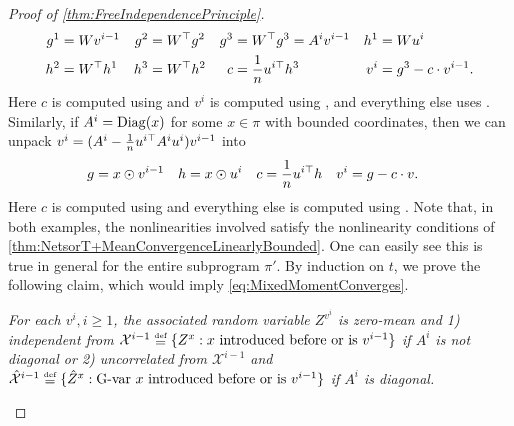 \documentclass[main.tex]{subfiles}
\begin{document}
\begin{proof}[Proof of \cref{thm:FreeIndependencePrinciple}]
\begin{align*}
g^{1} & =Wv^{i-1}&
g^{2} & =W^{\top}g^{2}&
g^{3} & =W^{\top}g^{3}=A^{i}v^{i-1}&
h^{1} & =Wu^{i}\\
h^{2} & =W^{\top}h^{1}&
h^{3} & =W^{\top}h^{2}&
c & =\frac{1}{n}u^{i\top}h^{3}&
v^{i} & =g^{3}-c\cdot v^{i-1}.
\end{align*}
Here $c$ is computed using  and $v^i$ is computed using , and everything else uses .
Similarly, if $A^{i}=\mathrm{Diag}(x)$ for some $x\in\pi$ with bounded coordinates, then we can unpack $v^{i}=(A^{i}-\frac{1}{n}u^{i\top}A^{i}u^{i})v^{i-1}$ into
\begin{align*}
g & =x\odot v^{i-1}&
h & =x\odot u^{i}&
c & =\frac{1}{n}u^{i\top}h&
v^{i} & =g-c\cdot v.
\end{align*}
Here $c$ is computed using  and everything else is computed using .
Note that, in both examples, the nonlinearities involved satisfy the nonlinearity conditions of \cref{thm:NetsorT+MeanConvergenceLinearlyBounded}.
One can easily see this is true in general for the entire subprogram $\pi'$.
By induction on $t$, we prove the following claim, which would imply \cref{eq:MixedMomentConverges}.
\begin{claim}
\emph{For each $v^{i},i\ge1$, the associated random variable $Z^{v^{i}}$ is zero-mean and 1) independent from $\mathcal{X}^{i-1}\defeq\{Z^{x}:\text{\ensuremath{x} introduced before or is \ensuremath{v^{i-1}}\}}$ if $A^{i}$ is not diagonal or 2) uncorrelated from $\mathcal{\mathcal{X}}^{i-1}$ and $\hat{\mathcal{X}}^{i-1}\defeq\{\hat{Z}^{x}:\text{G-var \ensuremath{x} introduced before or is \ensuremath{v^{i-1}}\}}$ if $A^{i}$ is diagonal.}
\end{claim}


\end{proof}
\end{document}
